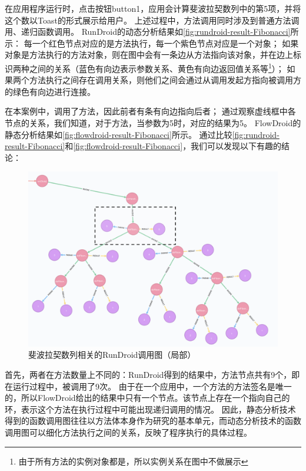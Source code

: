 在应用程序运行时，点击按钮button1，应用会计算斐波拉契数列中的第5项，并将这个数以Toast的形式展示给用户。
上述过程中，方法调用同时涉及到普通方法调用、递归函数调用。
RunDroid的动态分析结果如\autoref{fig:rundroid-result-Fibonacci}所示：
每一个红色节点对应的是方法执行，每一个紫色节点对应是一个对象；
如果对象是方法执行的方法对象，则在图中会有一条边从方法指向该对象，并在边上标识两种之间的关系（蓝色有向边表示参数关系、黄色有向边返回值关系等\footnote{由于所有方法的实例对象都是，所以实例关系在图中不做展示}）；
如果两个方法执行之间存在调用关系，则他们之间会通过从调用发起方指向被调用方的绿色有向边进行连接。

在本案例中，调用了方法，因此前者有条有向边指向后者；
通过观察虚线框中各节点的关系，我们知道，对于方法，当参数为5时，对应的结果为5。
FlowDroid的静态分析结果如\autoref{fig:flowdroid-result-Fibonacci}所示。
通过比较\autoref{fig:rundroid-result-Fibonacci}和\autoref{fig:flowdroid-result-Fibonacci}，我们可以发现以下有趣的结论：


\begin{figure}[!ht]
	\centering
	\includegraphics[width=\textwidth]{./Figures/doFibonacci-rundroid.png}
	\caption{斐波拉契数列相关的RunDroid调用图（局部）}
	\label{fig:rundroid-result-Fibonacci}
\end{figure}

首先，两者在方法数量上不同的：RunDroid得到的结果中，方法节点共有9个，即在运行过程中，被调用了9次。
由于在一个应用中，一个方法的方法签名是唯一的，所以FlowDroid给出的结果中只有一个节点。该节点上存在一个指向自己的环，表示这个方法在执行过程中可能出现递归调用的情况。
因此，静态分析技术得到的函数调用图往往以方法体本身作为研究的基本单元，而动态分析技术的函数调用图可以细化方法执行之间的关系，反映了程序执行的具体过程。



